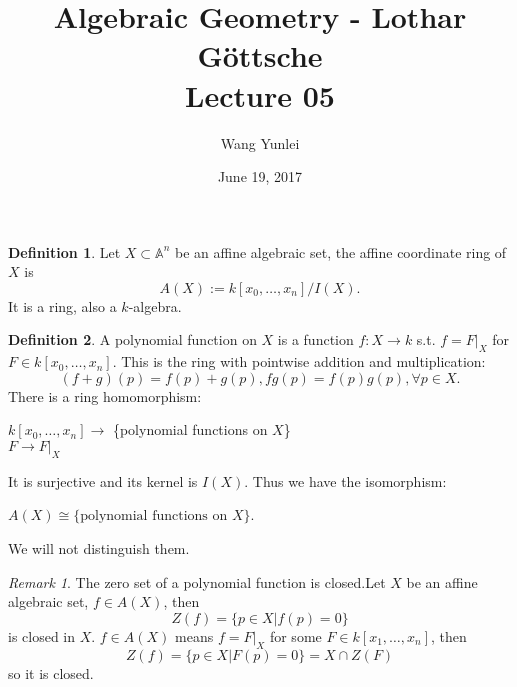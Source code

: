 \documentclass{amsart}
\theoremstyle{plain}
\theoremstyle{definition}
\newtheorem{definition}{Definition}
\theoremstyle{remark}
\newtheorem*{remark}{Remark}
\numberwithin{equation}{section}
\begin{document}
\title[Complete-simple distributive lattices]
{Algebraic Geometry - Lothar G\"{o}ttsche \\
	Lecture 05}
\author{Wang Yunlei}
\date{June 19, 2017}
 
\maketitle
 \begin{definition}
 	Let $ X\subset \mathbb{A}^n $ be an affine algebraic set, the affine coordinate ring of $ X $ is
 	\begin{equation}
 	A(X):=k[x_0,\dots,x_n]/I(X).
 	\end{equation}
 	It is a ring, also a $ k $-algebra.
 \end{definition}
 \begin{definition}
 	A polynomial function on $ X $ is a function $ f:X\to k $ s.t. $ f=F|_X $ for $ F\in k[x_0,\dots,x_n] $. This is the ring with pointwise addition and multiplication:
 	$$
 	(f+g)(p)=f(p)+g(p), fg(p)=f(p)g(p),\forall p\in X.
 	$$
 	There is a ring homomorphism:
 	\begin{center}
 		$ k[x_0,\dots,x_n] \to $ \{polynomial functions on $ X $\}\\
 		$ F\to F|_X $
 	\end{center}
 	It is surjective and its kernel is $ I(X) $. Thus we have the isomorphism:
 	\begin{center}
 		$ A(X)\cong \{ \text{polynomial functions on } X \} $.
 	\end{center}
 	We will not distinguish them.
 \end{definition}
 \begin{remark}
 	The zero set of a polynomial function is closed.Let $ X $ be an affine algebraic set, $ f\in A(X) $, then
 	\begin{equation}
 	Z(f)=\{ p\in X|f(p)=0 \}
 	\end{equation}
 	is closed in $ X $. $ f\in A(X) $ means $ f=F|_X $ for some $ F\in k[x_1,\dots,x_n] $, then
 	\begin{equation}
 	Z(f)=\{ p\in X|F(p)=0 \}=X\cap Z(F)
 	\end{equation}
 	so it is closed.
 \end{remark}
\end{document}
